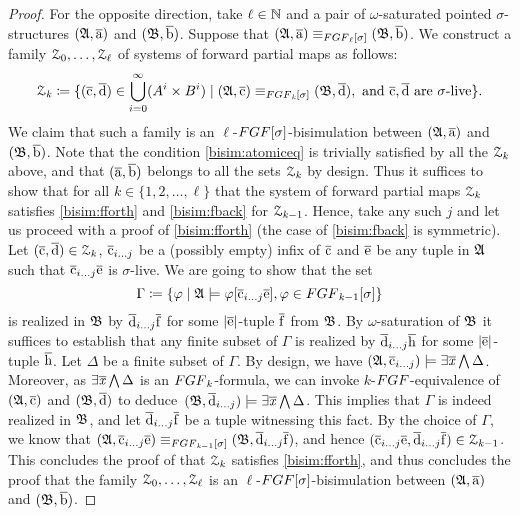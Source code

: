 \begin{proof}
For the opposite direction, take $\ell \in {\mathbb{N}}$ and a pair of $\omega$-saturated pointed $\sigma$-structures $({\mathfrak{A}}, \overline{\mathrm{a}})$ and $({\mathfrak{B}}, \overline{\mathrm{b}})$.
Suppose that $(\str{A}, \elemtuplea) \equiv_{\FGF_\ell[\sigma]} (\str{B}, \elemtupleb)$.
We construct a family $\mathcal{Z}_0, \ldots, \mathcal{Z}_\ell$ of systems of forward partial maps as follows:
\[
  \bisimZ_\mathit{k} \coloneqq \{ (\elemtuplec, \elemtupled) \in \bigcup_{i=0}^{\infty} (A^i \times B^i) \mid  (\str{A}, \elemtuplec) \equiv_{\FGF_\mathit{k}[\sigma]} (\str{B}, \elemtupled), \ \text{and} \ \elemtuplec, \elemtupled \ \text{are $\sigma$-live} \}. 
\]
We claim that such a family is an $\ell$-$\FGF[\sigma]$-bisimulation between $({\mathfrak{A}}, \overline{\mathrm{a}})$ and $({\mathfrak{B}}, \overline{\mathrm{b}})$. 
Note that the condition \ref{bisim:atomiceq} is trivially satisfied by all the $\mathcal{Z}_\mathit{k}$ above, and that $(\overline{\mathrm{a}}, \overline{\mathrm{b}})$ belongs to all the sets $\mathcal{Z}_\mathit{k}$ by design.
Thus it suffices to show that for all $\mathit{k} \in \{ 1, 2, \ldots, \ell\}$ that the system of forward partial
maps $\mathcal{Z}_\mathit{k}$ satisfies \ref{bisim:fforth} and \ref{bisim:fback} for $\mathcal{Z}_{\mathit{k}{-}1}$.
Hence, take any such $j$ and let us proceed with a proof of \ref{bisim:fforth} (the case of \ref{bisim:fback} is symmetric). 
Let $(\overline{\mathrm{c}}, \overline{\mathrm{d}}) \in \mathcal{Z}_\mathit{k}$, $\overline{\mathrm{c}}_{i\ldots j}$ be a (possibly empty) infix of $\overline{\mathrm{c}}$
and $\overline{\mathrm{e}}$ be any tuple in ${\mathfrak{A}}$ such that $\overline{\mathrm{c}}_{i\ldots j}\overline{\mathrm{e}}$ is $\sigma$-live.
We are going to show that the set 
\[
  \Gamma \deff \{ \varphi \mid \str{A} \models \varphi[\elemtuplecfromto{i}{j}\elemtuplee], \varphi \in \FGF_{\mathit{k}{-}1}[\sigma] \}
\] 
is realized in ${\mathfrak{B}}$ by $\overline{\mathrm{d}}_{i\ldots j}\overline{\mathrm{f}}$ for some $|\overline{\mathrm{e}}|$-tuple $\overline{\mathrm{f}}$ from ${\mathfrak{B}}$.
By $\omega$-saturation of ${\mathfrak{B}}$ it suffices
to establish that any finite subset of $\Gamma$ is realized by $\overline{\mathrm{d}}_{i\ldots j}\overline{\mathrm{h}}$ for some $|\overline{\mathrm{e}}|$-tuple $\overline{\mathrm{h}}$. 
Let $\Delta$ be a finite subset of $\Gamma$.
By design, we have 
$({\mathfrak{A}}, \overline{\mathrm{c}}_{i\ldots j}) \models \exists{\overline{\mathit{x}}} \textstyle\bigwedge \Delta$.
Moreover, as $\exists{\overline{\mathit{x}}} \textstyle\bigwedge \Delta$ is an $\FGF_\mathit{k}$-formula,
we can invoke $\mathit{k}$-$\FGF$-equivalence of $({\mathfrak{A}}, \overline{\mathrm{c}})$ and $({\mathfrak{B}}, \overline{\mathrm{d}})$ to deduce~$({\mathfrak{B}}, \overline{\mathrm{d}}_{i\ldots j}) \models \exists{\overline{\mathit{x}}} \textstyle\bigwedge \Delta$.
This implies that $\Gamma$ is indeed realized in ${\mathfrak{B}}$, and let $\overline{\mathrm{d}}_{i\ldots j}\overline{\mathrm{f}}$ be a tuple witnessing this fact.
By the choice of $\Gamma$, we know that  $(\str{A}, \elemtuplecfromto{i}{j}\elemtuplee) \equiv_{\FGF_{\mathit{k}{-}1}[\sigma]} (\str{B}, \elemtupledfromto{i}{j}\elemtuplef)$, and hence
$(\overline{\mathrm{c}}_{i\ldots j}\overline{\mathrm{e}}, \overline{\mathrm{d}}_{i\ldots j}\overline{\mathrm{f}}) \in \mathcal{Z}_{\mathit{k}{-}1}$. 
This concludes the proof of that $\mathcal{Z}_{\mathit{k}}$ satisfies \ref{bisim:fforth}, and thus concludes the proof that the family $\mathcal{Z}_0, \ldots, \mathcal{Z}_\ell$ is an $\ell$-$\FGF[\sigma]$-bisimulation between $({\mathfrak{A}}, \overline{\mathrm{a}})$ and $({\mathfrak{B}}, \overline{\mathrm{b}})$. 
\end{proof}
